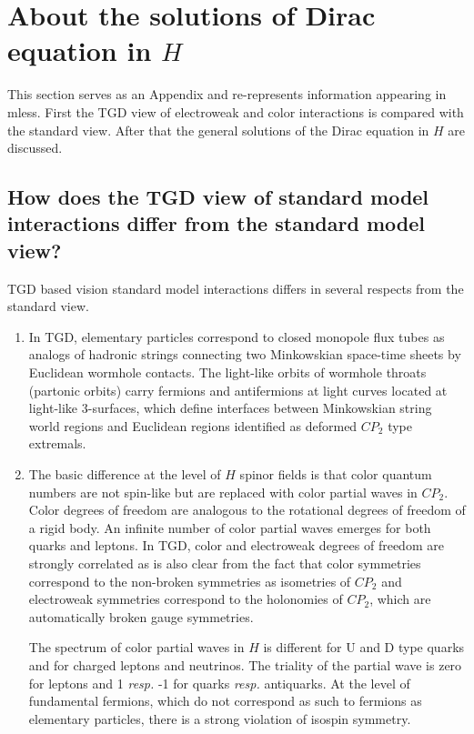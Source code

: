\documentclass[10pt,epsf]{article}
\begin{document}
\appendix

\section{About the solutions of Dirac equation in $H$}

This section serves as an Appendix and re-represents information appearing in \cite{allb}{mless}. First the TGD view   of electroweak and color  interactions is compared with the standard view. After that the  general solutions of the Dirac equation in $H$ are discussed.


\subsection{How does the TGD view of standard model interactions differ from the standard model view?}

TGD based vision standard model interactions differs in several respects  from the standard view.

\begin{enumerate}

\item In TGD, elementary particles correspond to closed  monopole flux tubes as analogs of hadronic strings connecting two Minkowskian space-time sheets by Euclidean wormhole contacts. The light-like orbits of wormhole throats (partonic orbits) carry   fermions and antifermions at light curves located at light-like 3-surfaces, which define  interfaces between  Minkowskian string world regions and Euclidean regions identified as deformed  $CP_2$ type extremals.  

\item The basic difference at the level of $H$ spinor fields is that color quantum numbers are  not  spin-like but  are replaced with color partial waves in $CP_2$. Color degrees of freedom are analogous to the rotational degrees of freedom of a rigid body. An infinite number of color partial waves  emerges for both quarks and leptons.  In TGD, color and electroweak degrees of freedom are  strongly correlated as is also clear from the fact that color symmetries correspond to the non-broken symmetries as isometries of $CP_2$ and electroweak symmetries correspond to the holonomies of $CP_2$, which are automatically broken gauge symmetries.

The spectrum of color partial waves  in $H$ is different for U and D type quarks and for charged leptons and neutrinos.  The triality of the partial wave is zero for leptons and 1 {\it resp.} -1 for quarks {\it resp.} antiquarks. At the level of fundamental fermions, which do not correspond as such to fermions as elementary particles, there is a strong violation of isospin symmetry.


\end{enumerate}
\end{document}
